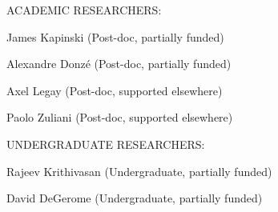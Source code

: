                \begin{indentation}{36pt}{0pt}{0pt}
                 
               \end{indentation}

               \begin{indentation}{0pt}{0pt}{0pt}
                 \uppercase{ACADEMIC RESEARCHERS:}
               \end{indentation}
   	       
               \begin{indentation}{0pt}{0pt}{36pt}
                 James Kapinski (Post-doc, partially funded)
               \end{indentation}

               \begin{indentation}{0pt}{0pt}{36pt}
                 Alexandre Donz\'e (Post-doc, partially funded)
               \end{indentation}

               \begin{indentation}{0pt}{0pt}{0pt}
                 Axel Legay (Post-doc, supported elsewhere)
               \end{indentation}

               \begin{indentation}{0pt}{0pt}{0pt}
                 Paolo Zuliani (Post-doc, supported elsewhere)
               \end{indentation}

               \begin{indentation}{0pt}{0pt}{0pt}
               \end{indentation}

               \begin{indentation}{0pt}{0pt}{0pt}
                 \uppercase{UNDERGRADUATE RESEARCHERS:}
               \end{indentation}
   	       
               \begin{indentation}{0pt}{0pt}{36pt}
                 Rajeev Krithivasan (Undergraduate, partially funded)
               \end{indentation}

               \begin{indentation}{0pt}{0pt}{36pt}
                 David DeGerome (Undergraduate, partially funded)
               \end{indentation}

